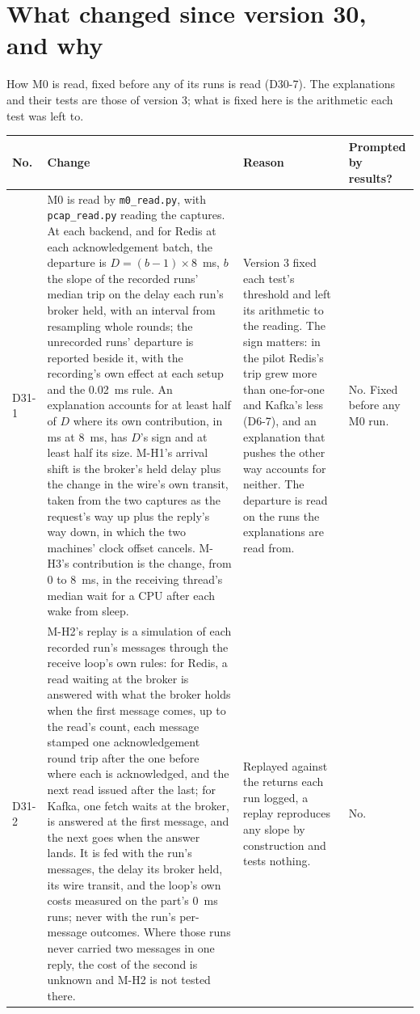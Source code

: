 \documentclass[11pt]{article}
\begin{document}
\section*{What changed since version 30, and why}
How M0 is read, fixed before any of its runs is read (D30-7). The explanations and their
tests are those of version 3; what is fixed here is the arithmetic each test was left to.

{\small
\begin{longtable}{@{}p{1.1cm} >{\raggedright\arraybackslash}p{6.1cm} >{\raggedright\arraybackslash}p{6.0cm} >{\raggedright\arraybackslash}p{2.2cm}@{}}
\toprule
\textbf{No.} & \textbf{Change} & \textbf{Reason} & \textbf{Prompted by results?} \\
\midrule
\endhead
D31-1 & M0 is read by \texttt{m0\_read.py}, with \texttt{pcap\_read.py} reading the captures. At each backend, and for Redis at each acknowledgement batch, the departure is $D = (b - 1) \times 8$~ms, $b$ the slope of the recorded runs' median trip on the delay each run's broker held, with an interval from resampling whole rounds; the unrecorded runs' departure is reported beside it, with the recording's own effect at each setup and the 0.02~ms rule. An explanation accounts for at least half of $D$ where its own contribution, in ms at 8~ms, has $D$'s sign and at least half its size. M-H1's arrival shift is the broker's held delay plus the change in the wire's own transit, taken from the two captures as the request's way up plus the reply's way down, in which the two machines' clock offset cancels. M-H3's contribution is the change, from 0 to 8~ms, in the receiving thread's median wait for a CPU after each wake from sleep. & Version 3 fixed each test's threshold and left its arithmetic to the reading. The sign matters: in the pilot Redis's trip grew more than one-for-one and Kafka's less (D6-7), and an explanation that pushes the other way accounts for neither. The departure is read on the runs the explanations are read from. & No. Fixed before any M0 run. \\
D31-2 & M-H2's replay is a simulation of each recorded run's messages through the receive loop's own rules: for Redis, a read waiting at the broker is answered with what the broker holds when the first message comes, up to the read's count, each message stamped one acknowledgement round trip after the one before where each is acknowledged, and the next read issued after the last; for Kafka, one fetch waits at the broker, is answered at the first message, and the next goes when the answer lands. It is fed with the run's messages, the delay its broker held, its wire transit, and the loop's own costs measured on the part's 0~ms runs; never with the run's per-message outcomes. Where those runs never carried two messages in one reply, the cost of the second is unknown and M-H2 is not tested there. & Replayed against the returns each run logged, a replay reproduces any slope by construction and tests nothing. & No. \\

\end{longtable}}
\end{document}
